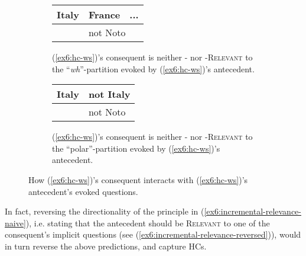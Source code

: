 \begin{figure}[H]
	\centering
	\begin{subfigure}[t]{.47\linewidth}
		\centering
			\begin{tabular}{llll|}
				\hline
				\multicolumn{2}{|l|}{Italy} & \multicolumn{1}{l|}{France} & ... \\ \hline
				\multicolumn{1}{l|}{}   & \multicolumn{3}{l|}{\cellcolor{orange!20!white}not Noto}         \\ \cline{2-4} 
			\end{tabular}
		\caption[]{(\ref{ex6:hc-ws})'s consequent is neither \textsc{\citeauthor{Lewis1988}-} nor \textsc{\citeauthor{Roberts2012}-Relevant} to the ``\textit{wh}''-partition evoked by (\ref{ex6:hc-ws})'s antecedent.}\label{tab:italy-not-noto-wh-rel}
	\end{subfigure}
	\hfill
	\begin{subfigure}[t]{.47\linewidth}
		\centering
		\begin{tabular}{llll|}
			\hline
			\multicolumn{2}{|l|}{Italy} & \multicolumn{2}{l|}{not Italy} \\ \hline
			\multicolumn{1}{l|}{}   & \multicolumn{3}{l|}{\cellcolor{orange!20!white}not Noto}      \\ \cline{2-4} 
		\end{tabular}
		\caption[]{(\ref{ex6:hc-ws})'s consequent is neither \textsc{\citeauthor{Lewis1988}-} nor \textsc{\citeauthor{Roberts2012}-Relevant} to the ``polar''-partition evoked by (\ref{ex6:hc-ws})'s antecedent.}\label{tab:italy-not-noto-polar-rel}
	\end{subfigure}
	\caption[]{How (\ref{ex6:hc-ws})'s consequent interacts with (\ref{ex6:hc-ws})'s antecedent's evoked questions.}
\end{figure}

In fact, reversing the directionality of the principle in (\ref{ex6:incremental-relevance-naive}), i.e. stating that the antecedent should be \textsc{Relevant} to one of the consequent's implicit questions (see (\ref{ex6:incremental-relevance-reversed})), would in turn reverse the above predictions, and capture HCs. 


\begin{exe}
	\label{ex6:incremental-relevance-reversed}
\end{exe}


